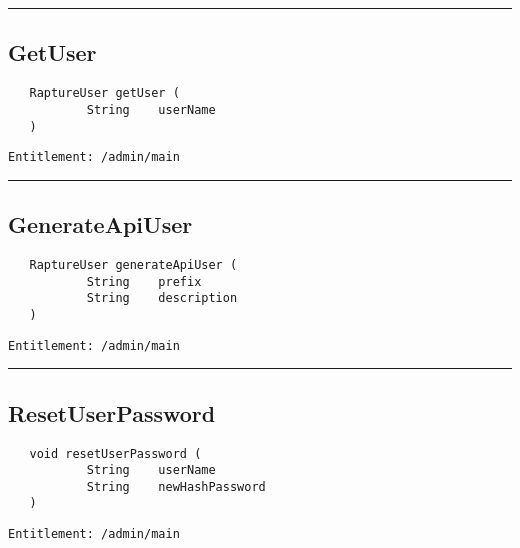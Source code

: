 \rule{12cm}{2pt}
\subsection{GetUser}
\label{Api:GetUser}
\begin{verbatim}
   RaptureUser getUser (
           String    userName
   )
\end{verbatim}
\begin{Verbatim}[fontsize=\small, formatcom=\color{Maroon}]
  Entitlement: /admin/main
\end{Verbatim}



\rule{12cm}{2pt}
\subsection{GenerateApiUser}
\label{Api:GenerateApiUser}
\begin{verbatim}
   RaptureUser generateApiUser (
           String    prefix
           String    description
   )
\end{verbatim}
\begin{Verbatim}[fontsize=\small, formatcom=\color{Maroon}]
  Entitlement: /admin/main
\end{Verbatim}



\rule{12cm}{2pt}
\subsection{ResetUserPassword}
\label{Api:ResetUserPassword}
\begin{verbatim}
   void resetUserPassword (
           String    userName
           String    newHashPassword
   )
\end{verbatim}
\begin{Verbatim}[fontsize=\small, formatcom=\color{Maroon}]
  Entitlement: /admin/main
\end{Verbatim}



